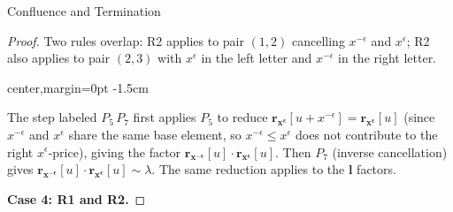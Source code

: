\documentclass{article}
\theoremstyle{definition}
\theoremstyle{remark}
\theoremstyle{theorem}
\theoremstyle{definition}
\begin{document}
\begin{section}{Confluence and Termination}
\begin{proof}
Two rules overlap: R2 applies to pair $(1,2)$ cancelling $x^{-\epsilon}$ and $x^\epsilon$; R2 also applies to pair $(2,3)$ with $x^\epsilon$ in the left letter and $x^{-\epsilon}$ in the right letter.
\vspace{40pt}
\begin{center}
\begin{adjustbox}{center,margin=0pt -1.5cm}
\end{adjustbox}
\end{center}
\vspace{40pt}

The step labeled $P_5\,P_7$ first applies $P_5$ to reduce $\mathbf{r_{x^\epsilon}}[u+x^{-\epsilon}] = \mathbf{r_{x^\epsilon}}[u]$ (since $x^{-\epsilon}$ and $x^\epsilon$ share the same base element, so $x^{-\epsilon} \leq x^\epsilon$ does not contribute to the right $x^\epsilon$-price), giving the factor $\mathbf{r_{x^{-\epsilon}}}[u]\cdot\mathbf{r_{x^\epsilon}}[u]$. Then $P_7$ (inverse cancellation) gives $\mathbf{r_{x^{-\epsilon}}}[u]\cdot\mathbf{r_{x^\epsilon}}[u] \sim \lambda$. The same reduction applies to the $\mathbf{l}$ factors.

\textbf{Case 4: R1 and R2.}


\end{proof}
\end{section}
\end{document}
